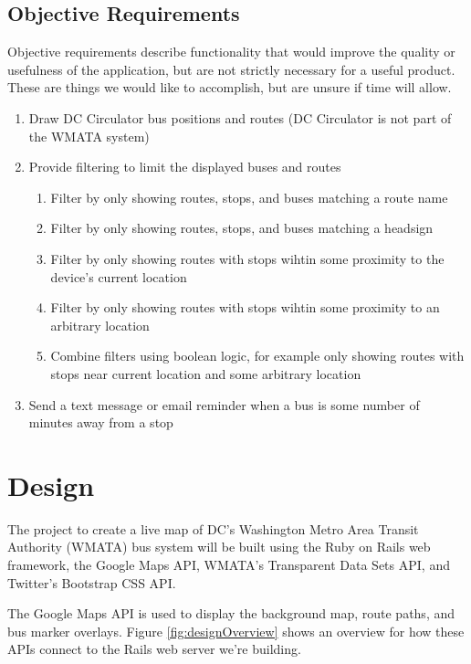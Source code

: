 \documentclass[12pt]{report}
\begin{document}
\section{Objective Requirements}
Objective requirements describe functionality that would improve the quality or usefulness of the application, but are not strictly necessary for a useful product.  These are things we would like to accomplish, but are unsure if time will allow.
\begin{enumerate}
\item Draw DC Circulator bus positions and routes (DC Circulator is not part of the WMATA system)
\item Provide filtering to limit the displayed buses and routes
\begin{enumerate}
\item Filter by only showing routes, stops, and buses matching a route name
\item Filter by only showing routes, stops, and buses matching a headsign
\item Filter by only showing routes with stops wihtin some proximity to the device's current location 
\item Filter by only showing routes with stops wihtin some proximity to an arbitrary location
\item Combine filters using boolean logic, for example only showing routes with stops near current location and some arbitrary location
\end{enumerate}
\item Send a text message or email reminder when a bus is some number of minutes away from a stop
\end{enumerate}

\chapter{Design}

The project to create a live map of DC's Washington Metro Area Transit Authority (WMATA) bus system will be built using the Ruby on Rails web framework, the Google Maps API, WMATA's Transparent Data Sets API, and Twitter's Bootstrap CSS API.

The Google Maps API is used to display the background map, route paths, and bus marker overlays.  Figure \ref{fig:designOverview} shows an overview for how these APIs connect to the Rails web server we're building.
\end{document}
